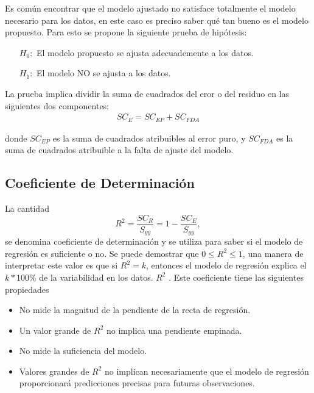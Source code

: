 \documentclass[a4paper]{report} %
\begin{document}
Es com\'un encontrar que el modelo ajustado no satisface totalmente el modelo necesario para los datos, en este caso es preciso saber qu\'e tan bueno es el modelo propuesto. Para esto se propone la siguiente prueba de hip\'otesis:
\begin{itemize}
\item[$H_{0}:$ ]El modelo propuesto se ajusta adecuademente a los datos.
\item[$H_{1}:$ ]El modelo NO se ajusta a los datos.
\end{itemize}
La prueba implica dividir la suma de cuadrados del eror o del residuo en las siguientes dos componentes:
\begin{eqnarray}\label{Suma.cuadrdos.errores}
SC_{E}=SC_{EP}+SC_{FDA}
\end{eqnarray}

donde $SC_{EP}$ es la suma de cuadrados atribuibles al error puro, y $SC_{FDA}$ es la suma de cuadrados atribuible a la falta de ajuste del modelo.

\subsection{Coeficiente de Determinaci\'on}


La cantidad
\begin{equation}\label{Coeficiente.Determinacion}
R^{2}=\frac{SC_{R}}{S_{yy}}=1-\frac{SC_{E}}{S_{yy}},
\end{equation}
se denomina coeficiente de determinaci\'on y se utiliza para saber si el modelo de regresi\'on es suficiente o no. Se puede demostrar que $0\leq R^{2}\leq1$, una manera de interpretar este valor es que si $R^{2}=k$, entonces el modelo de regresi\'on explica el $k*100\%$ de la variabilidad en los datos.
$R^{2}$ . Este coeficiente tiene las siguientes propiedades
\begin{itemize}
\item No mide la magnitud de la pendiente de la recta de regresi\'on.
\item Un valor grande de $R^{2}$ no implica una pendiente empinada.
\item No mide la suficiencia del modelo.
\item Valores grandes de $R^{2}$ no implican necesariamente que el modelo de regresi\'on proporcionar\'a predicciones precisas para futuras observaciones.
\end{itemize}
\end{document}
